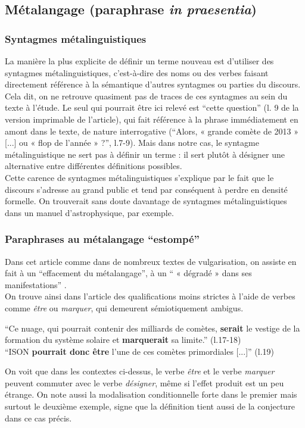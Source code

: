 \documentclass[a4paper,10pt]{article}
\begin{document}
	\subsection{Métalangage (paraphrase \textit{in praesentia})} \label{inpraesentia}
		\subsubsection{Syntagmes métalinguistiques}
			La manière la plus explicite de définir un terme nouveau est d'utiliser des syntagmes métalinguistiques, c'est-à-dire des noms ou des verbes faisant directement référence à la sémantique d'autres syntagmes ou parties du discours. Cela dit, on ne retrouve quasiment pas de traces de ces syntagmes au sein du texte à l'étude. Le seul qui pourrait être ici relevé est ``cette question'' (l. 9 de la version imprimable de l'article), qui fait référence à la phrase immédiatement en amont dans le texte, de nature interrogative (``Alors, « grande comète de 2013 » [...] ou « flop de l'année » ?'', l.7-9). Mais dans notre cas, le syntagme métalinguistique ne sert pas à définir un terme : il sert plutôt à désigner une alternative entre différentes définitions possibles.\\
			Cette carence de syntagmes métalinguistiques s'explique par le fait que le discours s'adresse au grand public et tend par conséquent à perdre en densité formelle. On trouverait sans doute davantage de syntagmes métalinguistiques dans un manuel d'astrophysique, par exemple.
		\subsubsection{Paraphrases au métalangage ``estompé''} \label{estompe}
			Dans cet article comme dans de nombreux textes de vulgarisation, on assiste en fait à un ``effacement du métalangage'', à un `` « dégradé » dans ses manifestations'' \cite{Mortureux1982}.\\
			On trouve ainsi dans l'article des qualifications moins strictes à l'aide de verbes comme \textit{être} ou \textit{marquer}, qui demeurent sémiotiquement ambigus.
			\begin{center}
				\footnotesize
				\begin{minipage}{0.7\textwidth}
					``Ce nuage, qui pourrait contenir des milliards de comètes, \textbf{serait} le vestige de la formation du système solaire et \textbf{marquerait} sa limite.'' (l.17-18)\\
					``ISON \textbf{pourrait donc être} l'une de ces comètes primordiales [...]'' (l.19)
				\end{minipage}
			\end{center}
			On voit que dans les contextes ci-dessus, le verbe \textit{être} et le verbe \textit{marquer} peuvent commuter avec le verbe \textit{désigner}, même si l'effet produit est un peu étrange. On note aussi la modalisation conditionnelle forte dans le premier mais surtout le deuxième exemple, signe que la définition tient aussi de la conjecture dans ce cas précis.\\
			
\end{document}
